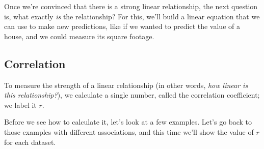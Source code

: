 Once we're convinced that there is a strong linear relationship, the next question is, what exactly \emph{is} the relationship?  For this, we'll build a linear equation that we can use to make new predictions, like if we wanted to predict the value of a house, and we could measure its square footage.

\subsection{Correlation}
To measure the strength of a linear relationship (in other words, \emph{how linear is this relationship?}), we calculate a single number, called the correlation coefficient; we label it $r$.

Before we see how to calculate it, let's look at a few examples.  Let's go back to those examples with different associations, and this time we'll show the value of $r$ for each dataset.

